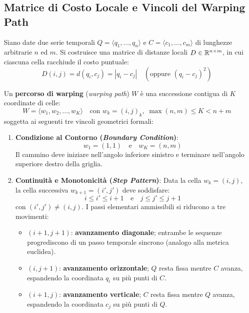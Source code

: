 \FloatBarrier
\subsection{Matrice di Costo Locale e Vincoli del Warping Path}
\label{subsec:ts-dtw-path-constraints}

Siano date due serie temporali $Q = \langle q_1, \dots, q_n \rangle$ e $C = \langle c_1, \dots, c_m \rangle$ di lunghezze arbitrarie $n$ ed $m$. Si costruisce una matrice di distanze locali $D \in \mathbb{R}^{n \times m}$, in cui ciascuna cella racchiude il costo puntuale:
\begin{equation}
\label{eq:ts-local-cost}
D(i,j) = d(q_i, c_j) = |q_i - c_j| \quad (\text{oppure } (q_i - c_j)^2)
\end{equation}

Un \textbf{percorso di warping} (\textit{warping path}) $W$ \`e una successione contigua di $K$ coordinate di celle:
\begin{equation}
\label{eq:ts-warping-path-def}
W = \langle w_1, w_2, \dots, w_K \rangle \quad \text{con } w_k = (i, j)_k, \; \max(n, m) \le K < n + m
\end{equation}
soggetta ai seguenti tre vincoli geometrici formali:
\begin{enumerate}
    \item \textbf{Condizione al Contorno (\textit{Boundary Condition})}:
    \begin{equation}
    w_1 = (1, 1) \quad \text{e} \quad w_K = (n, m)
    \end{equation}
    Il cammino deve iniziare nell'angolo inferiore sinistro e terminare nell'angolo superiore destro della griglia.
    \item \textbf{Continuit\`a e Monotonicit\`a (\textit{Step Pattern})}:
    Data la cella $w_k = (i, j)$, la cella successiva $w_{k+1} = (i', j')$ deve soddisfare:
    \begin{equation}
    i \le i' \le i + 1 \quad \text{e} \quad j \le j' \le j + 1
    \end{equation}
    con $(i', j') \neq (i, j)$. I passi elementari ammissibili si riducono a tre movimenti:
    \begin{itemize}
        \item $(i+1, j+1)$: \textbf{avanzamento diagonale}; entrambe le sequenze progrediscono di un passo temporale sincrono (analogo alla metrica euclidea).
        \item $(i, j+1)$: \textbf{avanzamento orizzontale}; $Q$ resta fissa mentre $C$ avanza, espandendo la coordinata $q_i$ su pi\`u punti di $C$.
        \item $(i+1, j)$: \textbf{avanzamento verticale}; $C$ resta fissa mentre $Q$ avanza, espandendo la coordinata $c_j$ su pi\`u punti di $Q$.
    \end{itemize}
\end{enumerate}

